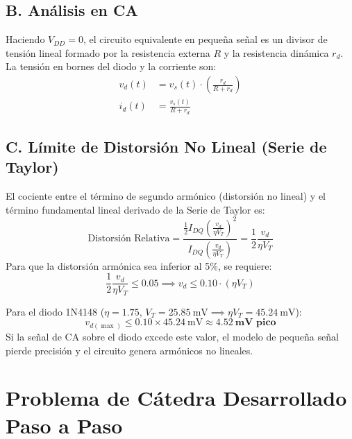 \documentclass[11pt, a4paper]{article}
\begin{document}
\subsection{B. Análisis en CA}
Haciendo $V_{DD} = 0$, el circuito equivalente en pequeña señal es un divisor de tensión lineal formado por la resistencia externa $R$ y la resistencia dinámica $r_d$. La tensión en bornes del diodo y la corriente son:
\begin{align}
    v_d(t) &= v_s(t) \cdot \left( \frac{r_d}{R + r_d} \right) \\
    i_d(t) &= \frac{v_s(t)}{R + r_d}
\end{align}

\subsection{C. Límite de Distorsión No Lineal (Serie de Taylor)}
El cociente entre el término de segundo armónico (distorsión no lineal) y el término fundamental lineal derivado de la Serie de Taylor es:
\begin{equation}
    \text{Distorsión Relativa} = \frac{\frac{1}{2} I_{DQ} \left(\frac{v_d}{\eta V_T}\right)^2}{I_{DQ} \left(\frac{v_d}{\eta V_T}\right)} = \frac{1}{2} \frac{v_d}{\eta V_T}
\end{equation}
Para que la distorsión armónica sea inferior al 5\%, se requiere:
\begin{equation}
    \frac{1}{2} \frac{v_d}{\eta V_T} \le 0.05 \implies v_d \le 0.10 \cdot (\eta V_T)
\end{equation}

Para el diodo 1N4148 ($\eta = 1.75$, $V_T = \qty{25.85}{\milli\volt} \implies \eta V_T = \qty{45.24}{\milli\volt}$):
\begin{equation}
    v_{d(\max)} \le 0.10 \times \qty{45.24}{\milli\volt} \approx \mathbf{\qty{4.52}{\milli\volt}\text{ pico}}
\end{equation}
Si la señal de CA sobre el diodo excede este valor, el modelo de pequeña señal pierde precisión y el circuito genera armónicos no lineales.

\newpage
\section{Problema de Cátedra Desarrollado Paso a Paso}
\end{document}
